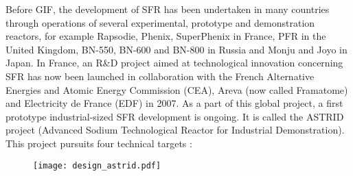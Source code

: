     Before GIF, the development of SFR has been undertaken in many countries through operations of several experimental, prototype and demonstration reactors,
for example Rapsodie, Phenix, SuperPhenix in France, PFR in the United Kingdom, BN-550, BN-600 and BN-800 in Russia and Monju and Joyo in Japan.
    In France, an R\&D project aimed at technological innovation concerning SFR has now been launched in collaboration with the French Alternative Energies and
Atomic Energy Commission (CEA), Areva (now called Framatome) and Electricity de France (EDF) in 2007. As a part of this global project, a first prototype industrial-sized SFR
development is ongoing. It is called the ASTRID project (Advanced Sodium Technological Reactor for Industrial Demonstration). This project pursuits four technical
targets \parencite{CEA20124thgenerationsodium}:

    \begin{figure}[htbp]
        \centerline{\texttt{[image: design\_astrid.pdf]}}
        \label{fig:design_astrid}
    \end{figure}

